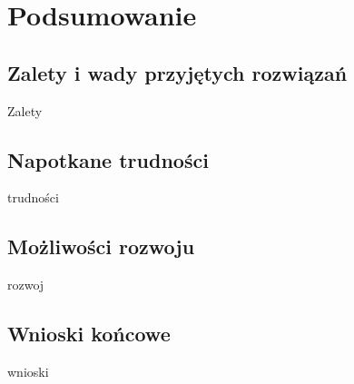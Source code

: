 \documentclass[12pt]{article}
\begin{document}
\begin{sloppypar}
\section{Podsumowanie}
{
  \subsection{Zalety i wady przyjętych rozwiązań}
  {
    Zalety
  }
  \subsection{Napotkane trudności}
  {
    trudności
  }
  \subsection{Możliwości rozwoju}
  {
    rozwoj
  }
  \subsection{Wnioski końcowe}
  {
    wnioski
  }
}

\clearpage
\printbibliography[
  heading=bibintoc,
  title={Bibliografia}
]

\clearpage
\listoffigures

\clearpage
\listoftables

\clearpage
{}
\lstlistoflistings

\end{sloppypar}
\end{document}

